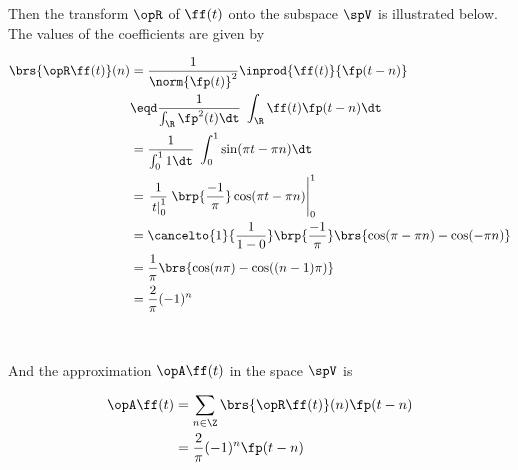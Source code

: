 Then the transform $\opR$ of $\ff(t)$ onto the subspace $\spV$ is
illustrated below.
The values of the coefficients are given by
\\
\begin{minipage}{\tw-95mm}
  \begin{align*}
    \brs{\opR\ff(t)}(n)
      &=    \frac{1}{\norm{\fp(t)}^2}\inprod{\ff(t)}{\fp(t-n)}
    \\&\eqd \frac{1}{\int_{\R} \fp^2(t)\dt}\; \int_{\R} \ff(t)\fp(t-n) \dt
    \\&=    \frac{1}{\int_0^1 1\dt}\; \int_0^1 \sin(\pi t-\pi n) \dt
    \\&=    \left. \frac{1}{\left. t\right|_0^1} \; \brp{\frac{-1}{\pi}}\cos(\pi t-\pi n) \right|_0^1
    \\&=    \cancelto{1}{\frac{1}{1-0}}\brp{\frac{-1}{\pi}}\brs{\cos(\pi -\pi n)-\cos(-\pi n)}%
    \\&=    \frac{1}{\pi}\brs{\cos(n\pi )-\cos((n-1)\pi)}%
    \\&=    \frac{2}{\pi}(-1)^n
  \end{align*}
\end{minipage}%
\hfill%
\begin{minipage}{90mm}%
  \mbox{}\\%
  
\end{minipage}


And the approximation $\opA\ff(t)$ in the space $\spV$ is \\
\begin{minipage}{\tw-77mm}
  \begin{align*}
    \opA\ff(t)
      &= \sum_{n\in\Z} \brs{\opR\ff(t)}(n) \fp(t-n)
    \\&= \frac{2}{\pi}(-1)^n \fp(t-n)
  \end{align*}
\end{minipage}%
\hfill%
\begin{minipage}{72mm}%
  \mbox{}\\%
\end{minipage}


